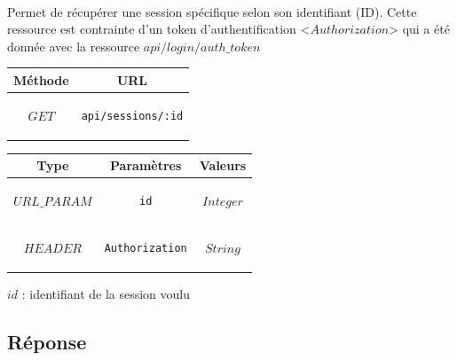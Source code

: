 \documentclass[titlepage, 12pt]{report}
\begin{document}
\paragraph{} Permet de récupérer une session spécifique selon son identifiant (ID). Cette ressource est contrainte d'un token d'authentification <$Authorization$> qui a été donnée avec la ressource $api/login/auth\_token$

\begin{center}
	\begin{tabular}{|c|c|}
	\hline
	Méthode & URL \\
	\hline
	$ GET $ 
	&
	\begin{lstlisting}
api/sessions/:id
	\end{lstlisting} 
	\\ \hline
	\end{tabular}
\end{center}


\begin{center}
	\begin{tabular}{|c|c|c|}
	\hline
	Type & Paramètres & Valeurs \\ \hline
	$ URL\_PARAM $ & 
	\begin{lstlisting}
id
	\end{lstlisting} &
	$ Integer $ \\ \hline
	$ HEADER $ & 
	\begin{lstlisting}
Authorization
	\end{lstlisting} &
	$ String $ \\ \hline
	
	\end{tabular}
\end{center}

\par $ id $ : identifiant de la session voulu
\subsection{Réponse}
\end{document}
